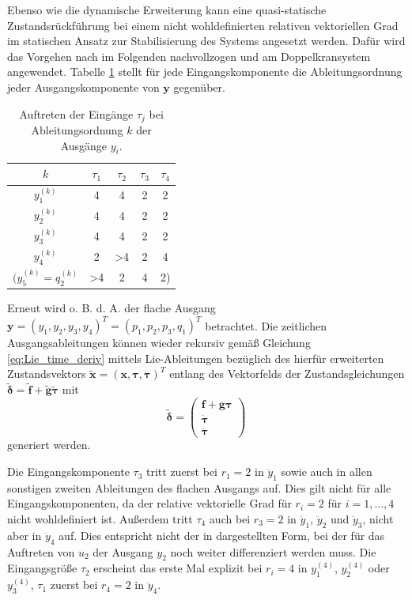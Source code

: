 Ebenso wie die dynamische Erweiterung kann eine quasi-statische Zustandsrückführung bei einem nicht wohldefinierten relativen vektoriellen Grad im statischen Ansatz zur Stabilisierung des Systems angesetzt werden. Dafür wird das Vorgehen nach \cite[S. 206]{NLRT_Roebenack} im Folgenden nachvollzogen und am Doppelkransystem angewendet. Tabelle \ref{tab:input_occurence} stellt für jede Eingangskomponente die Ableitungsordnung jeder Ausgangskomponente von $\mathbf{y}$ gegenüber.

\begin{table}[htbp]%
	\centering
	\caption{Auftreten der Eingänge $\tau_j$ bei Ableitungsordnung $k$ der Ausgänge $y_i$.}
	\label{tab:input_occurence}
	\begin{tabular}{ c| c c c c } 
		\toprule
		$k$ & $\tau_1$ & $\tau_2$ & $\tau_3$ & $\tau_4$ \\ 
		\hline
		$y_1^{(k)}$ & 4 & 4 & 2 & 2\\ 
		$y_2^{(k)}$ & 4 & 4 & 2 & 2\\
		$y_3^{(k)}$ & 4 & 4 & 2 & 2\\		
		$y_4^{(k)}$ & 2 & >4 & 2 & 4\\
		$(y_5^{(k)} = q_2^{(k)}$ & >4 & 2 & 4 & 2)\\
		\bottomrule
	\end{tabular}
\end{table}

Erneut wird o. B. d. A. der flache Ausgang ${\mathbf{y} = (y_1, y_2, y_3, y_4)^T = (p_1, p_2, p_3, q_1)^T}$ betrachtet. Die zeitlichen Ausgangsableitungen können wieder rekursiv gemäß Gleichung \eqref{eq:Lie_time_deriv} mittels Lie-Ableitungen bezüglich des hierfür erweiterten Zustandsvektors $\tilde{\mathbf{x}} = (\mathbf{x}, \boldsymbol{\tau}, \dot{\boldsymbol{\tau}})^T$ entlang des Vektorfelds der Zustandsgleichungen $\tilde{\boldsymbol{\delta}} = \tilde{\mathbf{f}} + \tilde{\mathbf{g}} \tilde{\boldsymbol{\tau}}$ mit
\begin{equation}
\tilde{\boldsymbol{\delta}} =
\left(\begin{matrix}
\mathbf{f} + \mathbf{g} \boldsymbol{\tau}\\
\dot{\boldsymbol{\tau}} \\
\ddot{\boldsymbol{\tau}}
\end{matrix}\right)
\end{equation}
generiert werden.

Die Eingangskomponente $\tau_3$ tritt zuerst bei $r_1 = 2$ in $\ddot{y}_1$ sowie auch in allen sonstigen zweiten Ableitungen des flachen Ausgangs auf. Dies gilt nicht für alle Eingangskomponenten, da der relative vektorielle Grad für $r_i = 2$ für $i = 1, ..., 4$ nicht wohldefiniert ist. Außerdem tritt $\tau_4$ auch bei $r_3 = 2$ in $\ddot{y}_1$, $\ddot{y}_2$ und $\ddot{y}_3$, nicht aber in $\ddot{y}_4$ auf. Dies entspricht nicht der in \cite[S. 206]{NLRT_Roebenack} dargestellten Form, bei der für das Auftreten von $u_2$ der Ausgang $y_2$ noch weiter differenziert werden muss. Die Eingangsgröße $\tau_2$ erscheint das erste Mal explizit bei $r_i = 4$ in $y_1^{(4)}$, $y_2^{(4)}$ oder $y_3^{(4)}$, $\tau_1$ zuerst bei $r_4 = 2$ in $\ddot{y}_4$.

